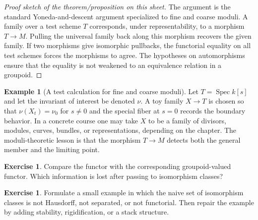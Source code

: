 \documentclass[11pt]{amsart}
\theoremstyle{definition}
\newtheorem{example}[theorem]{Example}
\newtheorem{exercise}[theorem]{Exercise}
\newcommand{\Spec}{\operatorname{Spec}}
\begin{document}
\begin{proof}[Proof sketch of the theorem/proposition on this sheet]
The argument is the standard Yoneda-and-descent argument specialized to fine and coarse moduli.  A family over a test scheme $T$ corresponds, under representability, to a morphism $T\to M$.  Pulling the universal family back along this morphism recovers the given family.  If two morphisms give isomorphic pullbacks, the functorial equality on all test schemes forces the morphisms to agree.  The hypotheses on automorphisms ensure that the equality is not weakened to an equivalence relation in a groupoid.
\end{proof}
\begin{example}[A test calculation for fine and coarse moduli]
Let $T=\Spec k[s]$ and let the invariant of interest be denoted $\nu$.  A toy family $X\to T$ is chosen so that $\nu(X_t)=\nu_0$ for $s\ne0$ and the special fiber at $s=0$ records the boundary behavior.  In a concrete course one may take $X$ to be a family of divisors, modules, curves, bundles, or representations, depending on the chapter.  The moduli-theoretic lesson is that the morphism $T\to M$ detects both the general member and the limiting point.
\end{example}
\begin{exercise}
Compare the functor with the corresponding groupoid-valued functor.  Which information is lost after passing to isomorphism classes?
\end{exercise}
\begin{exercise}
Formulate a small example in which the naive set of isomorphism classes is not Hausdorff, not separated, or not functorial.  Then repair the example by adding stability, rigidification, or a stack structure.
\end{exercise}
\clearpage
\end{document}
